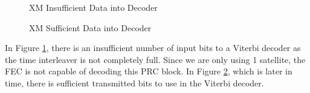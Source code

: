 \documentclass[conference,onecolumn]{IEEEtran}
\begin{document}
\begin{figure}[H]
	\centerline{}
	\caption{XM Insufficient Data into Decoder}
	\label{fig::Viterbi_1}
\end{figure}
\begin{figure}[H]
	\centerline{}
	\caption{XM Sufficient Data into Decoder}
	\label{fig::Viterbi_2}
\end{figure}

In Figure \ref{fig::Viterbi_1}, there is an insufficient number of input bits to a Viterbi decoder as the time interleaver is not completely full.  Since we are only using 1 satellite, the FEC is not capable of decoding this PRC block.  In Figure \ref{fig::Viterbi_2}, which is later in time, there is sufficient transmitted bits to use in the Viterbi decoder.\\
\end{document}
